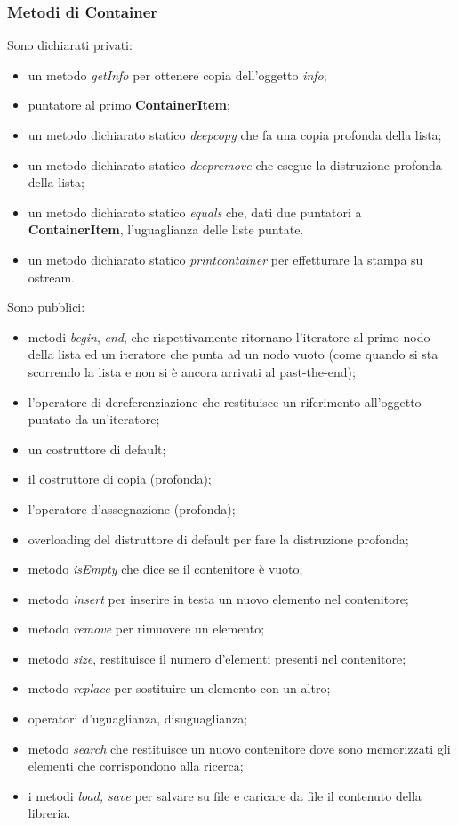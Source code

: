 {{			\subsubsection*{Metodi di Container}{
		Sono dichiarati privati:
			\begin{itemize}\itemsep=0.3pt
				\item un metodo \textit{getInfo} per ottenere copia dell'oggetto \textit{info};
				\item puntatore al primo \textbf{ContainerItem};
				\item un metodo dichiarato statico \textit{deepcopy} che fa una copia profonda della lista;
				\item un metodo dichiarato statico \textit{deepremove} che esegue la distruzione profonda della lista;
				\item un metodo dichiarato statico \textit{equals} che, dati due puntatori a \textbf{ContainerItem}, l'uguaglianza delle liste puntate.
				\item un metodo dichiarato statico \textit{printcontainer} per effetturare la stampa su ostream.
			\end{itemize}
			Sono pubblici:
			\begin{itemize}\itemsep=0.3pt
				\item metodi \textit{begin}, \textit{end}, che rispettivamente ritornano l'iteratore al primo nodo della lista ed un iteratore che punta ad un nodo vuoto (come quando si sta scorrendo la lista e non si è ancora arrivati al past-the-end);
				\item l'operatore di dereferenziazione che restituisce un riferimento all'oggetto puntato da un'iteratore;
				\item un costruttore di default;
				\item il costruttore di copia (profonda);
				\item l'operatore d'assegnazione (profonda);
				\item overloading del distruttore di default per fare la distruzione profonda;
				\item metodo \textit{isEmpty} che dice se il contenitore è vuoto;
				\item metodo \textit{insert} per inserire in testa un nuovo elemento nel contenitore;
				\item metodo \textit{remove} per rimuovere un elemento;
				\item metodo \textit{size}, restituisce il numero d'elementi presenti nel contenitore;
				\item metodo \textit{replace} per sostituire un elemento con un altro;
				\item operatori d'uguaglianza, disuguaglianza;
				\item metodo \textit{search} che restituisce un nuovo contenitore dove sono memorizzati gli elementi che corrispondono alla ricerca;
				\item i metodi \textit{load, save} per salvare su file e caricare da file il contenuto della libreria.
			\end{itemize}
			}
		}
}
